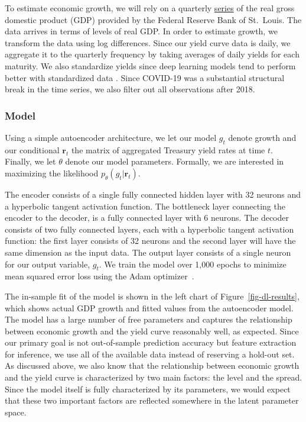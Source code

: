 \documentclass{article}
\theoremstyle{plain}
\theoremstyle{definition}
\theoremstyle{remark}
\begin{document}
To estimate economic growth, we will rely on a quarterly
\href{https://fred.stlouisfed.org/series/GDPC1}{series} of the real gross domestic product (GDP) provided by the Federal Reserve Bank of St.~Louis. The data arrives in terms of levels of real GDP. In order to estimate growth, we transform the data using log differences. Since
our yield curve data is daily, we aggregate it to the
quarterly frequency by taking averages of daily yields for each maturity. We also standardize yields since deep learning models tend to perform better with standardized data \cite{gal2019standardization}. Since COVID-19 was a substantial structural break in the time series, we also filter out all observations after 2018.

\subsubsection{Model}\label{model}


Using a simple autoencoder architecture, we let our model \(g_t\) denote growth and our conditional \(\mathbf{r}_t\) the matrix of aggregated Treasury yield rates at time \(t\). Finally, we let \(\theta\) denote our model parameters. Formally, we are interested in maximizing the likelihood \(p_{\theta}(g_t|\mathbf{r}_t)\). 

The encoder consists of a single fully connected hidden layer with 32 neurons and a hyperbolic tangent activation function. The bottleneck layer connecting the encoder to the decoder, is a fully connected layer with 6 neurons. The decoder consists of two fully connected layers, each with a hyperbolic tangent activation function: the first layer consists of 32 neurons and the second layer will have the same dimension as the input data. The output layer consists of a single neuron for our output variable, \(g_t\). We train the model over 1,000 epochs to minimize mean squared error loss using the Adam optimizer~\citep{kingma2017adam}.

The in-sample fit of the model is shown in the left chart of Figure~\ref{fig-dl-results}, which shows actual GDP growth and fitted values from the autoencoder
model. The model has a large number of free parameters and captures the relationship between economic growth and the yield curve reasonably well, as expected. Since our primary goal is not out-of-sample prediction accuracy but feature extraction for inference, we use all of the available data instead of reserving a hold-out set. As discussed above, we also know that the relationship between economic growth and the yield curve is characterized by two main factors: the level and the spread. Since the model itself is fully characterized by its parameters, we would expect that these two important factors are reflected somewhere in the latent parameter space. 
\end{document}
